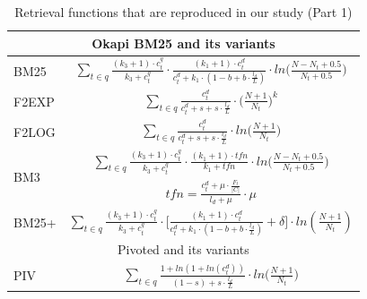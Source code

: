 
\newcommand{\specialcell}[2][c]{%
  \begin{tabular}[#1]{@{}c@{}}#2\end{tabular}}
    \begin{table}[t]
    \caption{Retrieval functions that are reproduced in our study (Part 1)\label{tab:allmodels}}
    \centering
    \begin{tabular}{ |l|c| }
     \hline
    \multicolumn{2}{|c|}{Okapi BM25 and its variants} \\ \hline
    BM25 & $
    \sum_{t \in q} {\frac{(k_3+1)\cdot c_{t}^{q}}{k_3+c_{t}^{q}}}\cdot \frac{(k_1+1) \cdot c_{t}^{d}}{c_{t}^{d} + k_1 \cdot (1-b+b\cdot \frac{l_{d}}{L})} \cdot ln \Big(\frac{N-N_{t}+0.5}{N_{t}+0.5}\Big) 
    $ \\ \hline

    F2EXP & $
    \sum_{t \in q}{\frac{c_{t}^{d}}{c_{t}^{d}+s+s\cdot \frac{l_{d}}{L}}}\cdot \Big(\frac{N+1}{N_t}\Big)^k
    $ \\ \hline

    F2LOG & $
    \sum_{t \in q}{\frac{c_{t}^{d}}{c_{t}^{d}+s+s\cdot \frac{l_{d}}{L}}}\cdot ln\Big(\frac{N+1}{N_t}\Big)
    $ \\ \hline

    \multirow{2}{*}{BM3} & $
    \sum_{t \in q} {\frac{(k_3+1)\cdot c_{t}^{q}}{k_3+c_{t}^{q}}}\cdot \frac{(k_1+1) \cdot tfn}{k_1+tfn} \cdot ln \Big(\frac{N-N_{t}+0.5}{N_{t}+0.5}\Big)
    $ \\ 
    & $
    tfn = \frac{c_{t}^{d}+\mu \cdot \frac{F_t}{|C|}}{l_{d}+\mu}\cdot \mu
    $ \\ \hline

    BM25+ & $
    \sum_{t \in q} {\frac{(k_3+1)\cdot c_{t}^{q}}{k_3+c_{t}^{q}}} \cdot \Big[\frac{(k_1+1) \cdot c_{t}^{d}}{c_{t}^{d} + k_1 \cdot (1-b+b \cdot \frac{l_{d}}{L})}+\delta\Big] \cdot ln (\frac{N+1}{N_{t}})
    $ \\ \hline
         \hline

    \multicolumn{2}{|c|}{Pivoted and its variants} \\ \hline 
    PIV & $
    \sum_{t \in q}{\frac{1+ln(1+ln(c_{t}^{d}))}{(1-s)+s\cdot \frac{l_{d}}{L}} \cdot ln \Big(\frac{N+1}{N_{t}}\Big)}
    $ \\ \hline


\end{tabular}
\end{table}
